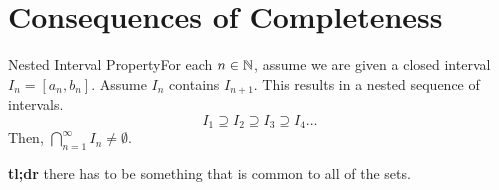 
\renewcommand{\theenumi}{\arabic{enumi}}
\renewcommand{\labelenumi}{\theenumi.}
\section{Consequences of Completeness}

\begin{ntheorem}
    {Nested Interval Property}For each \(n \in \mathbb{N}\), assume we are given a closed interval \(I_n = [a_n, b_n]\). Assume \(I_n\) contains \(I_{n+1}\). This results in a nested sequence of intervals. \[I_1 \supseteq I_2 \supseteq I_3 \supseteq I_4\dots\] Then, \(\bigcap^\infty_{n=1} I_{n} \ne \emptyset\).
\end{ntheorem}

\textbf{tl;dr} there has to be something that is common to all of the sets.

